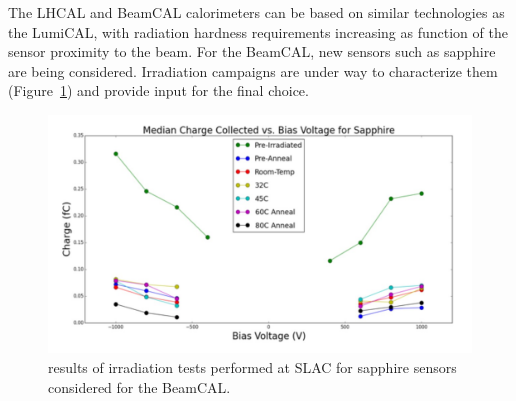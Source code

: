 The LHCAL and BeamCAL calorimeters can be based on similar technologies as the LumiCAL, with radiation hardness requirements increasing as function of the sensor proximity to the beam. For the BeamCAL, new sensors such as sapphire are being considered. Irradiation campaigns are under way to characterize them (Figure~\ref{fig:det:BEAMCAL_rad}) and provide input for the final choice. 

\begin{figure}[t!]
\centering
\includegraphics[width=0.8\hsize]{Detector/fig/BEAMCAL_rad.jpg}
\caption{results of irradiation tests performed at SLAC for sapphire sensors considered for the BeamCAL.}
\label{fig:det:BEAMCAL_rad}
\end{figure}

\vspace{2.0cm}